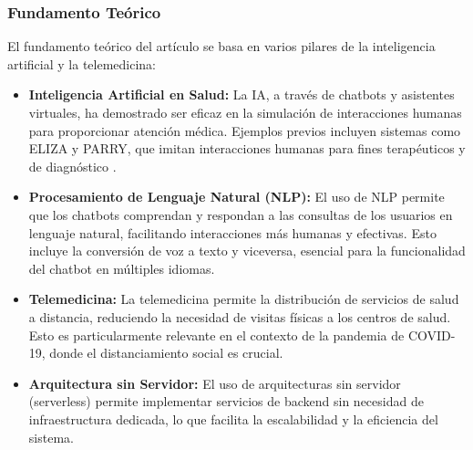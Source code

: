 	\subsubsection{Fundamento Teórico}
		El fundamento teórico del artículo se basa en varios pilares de la inteligencia artificial y la telemedicina:
		\begin{itemize}
		
		\item \textbf{Inteligencia Artificial en Salud:} La IA, a través de chatbots y asistentes virtuales, ha demostrado ser eficaz en la simulación de interacciones humanas para proporcionar atención médica. Ejemplos previos incluyen sistemas como ELIZA y PARRY, que imitan interacciones humanas para fines terapéuticos y de diagnóstico .
		
		\item \textbf{Procesamiento de Lenguaje Natural (NLP):} El uso de NLP permite que los chatbots comprendan y respondan a las consultas de los usuarios en lenguaje natural, facilitando interacciones más humanas y efectivas. Esto incluye la conversión de voz a texto y viceversa, esencial para la funcionalidad del chatbot en múltiples idiomas.
		
		\item \textbf{Telemedicina:} La telemedicina permite la distribución de servicios de salud a distancia, reduciendo la necesidad de visitas físicas a los centros de salud. Esto es particularmente relevante en el contexto de la pandemia de COVID-19, donde el distanciamiento social es crucial.
		
		\item \textbf{Arquitectura sin Servidor:} El uso de arquitecturas sin servidor (serverless) permite implementar servicios de backend sin necesidad de infraestructura dedicada, lo que facilita la escalabilidad y la eficiencia del sistema.
		\end{itemize}

